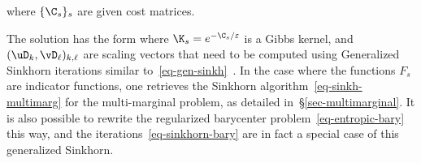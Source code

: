 where $\{\C_s\}_s$ are given cost matrices.

The solution has the form 
where $\K_s=e^{-\C_s/\varepsilon}$ is a Gibbs kernel, and $(\uD_k,\vD_\ell)_{k,\ell}$ are scaling vectors that need to be computed using Generalized Sinkhorn iterations similar to~\eqref{eq-gen-sinkh}~\citep{2016-chizat-sinkhorn}. 
%
In the case where the functions $F_s$ are indicator functions, one retrieves the Sinkhorn algorithm~\eqref{eq-sinkh-multimarg} for the multi-marginal problem, as detailed in~\S\ref{sec-multimarginal}. 
%
It is also possible to rewrite the regularized barycenter problem~\eqref{eq-entropic-bary} this way, and the iterations~\eqref{eq-sinkhorn-bary} are in fact a special case of this generalized Sinkhorn.

\fi %



